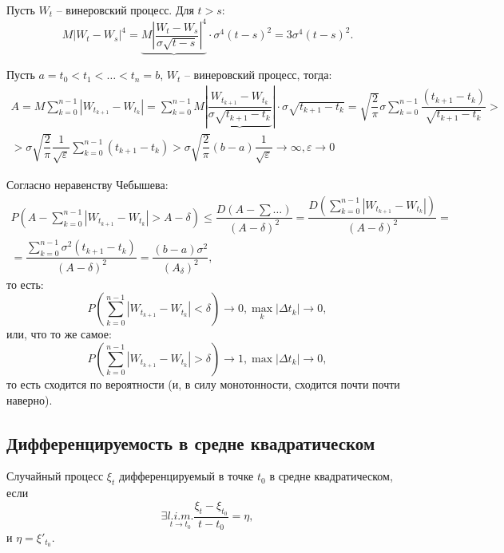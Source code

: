 \begin{ex}
  Пусть $W_t$ -- винеровский процесс. Для $t > s$:
  \[
    M|W_t - W_s|^4 = \underbrace{M \left| \dfrac{W_t - W_s}{\sigma \sqrt{t-s}} \right|^4} \cdot \sigma^4 (t-s)^2
    = 3 \sigma^4 (t-s)^2.
  \]
\end{ex}

Пусть $a=t_0 < t_1 < \dots < t_{n} = b$, $W_t$ -- винеровский процесс, тогда:
\begin{multline*}
  A = M\sum_{k=0}^{n-1} |W_{t_{k+1}} - W_{t_k}|
  = \sum_{k=0}^{n-1} M \left| \underbrace{\dfrac{W_{t_{k+1}} - W_{t_k}}{\sigma \sqrt{t_{k+1} - t_k}}} \right|
  \cdot \sigma \sqrt{t_{k+1} - t_{k}}
  = \sqrt{\dfrac{2}{\pi}} \sigma \sum_{k=0}^{n-1} \dfrac{(t_{k+1} - t_k)}{\sqrt{t_{k+1} - t_k}} > \\
  > \sigma \sqrt{\dfrac{2}{\pi}} \dfrac{1}{\sqrt{\varepsilon}} \sum_{k=0}^{n-1} (t_{k+1} - t_k)
  > \sigma \sqrt{\dfrac{2}{\pi}} (b-a) \dfrac{1}{\sqrt{\varepsilon}} \to \infty, \varepsilon \to 0
\end{multline*}

Согласно неравенству Чебышева:
\begin{multline*}
  P\left(A - \sum_{k=0}^{n-1} |W_{t_{k+1}} - W_{t_k}| > A - \delta\right)
  \leqslant \dfrac{D(A - \sum\dots)}{(A-\delta)^2}
  = \dfrac{D \left( \sum_{k=0}^{n-1} |W_{t_{k+1}} - W_{t_k}| \right) }{(A-\delta)^2} = \\
  = \dfrac{\sum_{k=0}^{n-1} \sigma^2 (t_{k+1} - t_k)}{(A-\delta)^2}
  = \dfrac{(b-a) \sigma^2 }{(A_\delta)^2},
\end{multline*}
то есть:
\[
  P \left( \sum_{k=0}^{n-1} |W_{t_{k+1}} - W_{t_k}| < \delta \right)  \to 0, \max_k |\Delta t_k| \to 0,
\]
или, что то же самое:
\[
  P \left( \sum_{k=0}^{n-1} |W_{t_{k+1}} - W_{t_k}| > \delta \right) \to 1, 
  \max |\Delta t_k| \to 0,
\]
то есть сходится по вероятности (и, в силу монотонности, сходится почти почти наверно).


\subsection{Дифференцируемость в средне квадратическом}

\begin{definition}
  Случайный процесс $\xi_t$ дифференцируемый в точке $t_0$ в средне квадратическом, если
  \[
    \exists \underset{t \to t_0}{l.i.m.} \dfrac{\xi_t - \xi_{t_0}}{t - t_0} = \eta,
  \]
  и $\eta = \xi'_{t_0}$.
\end{definition}

